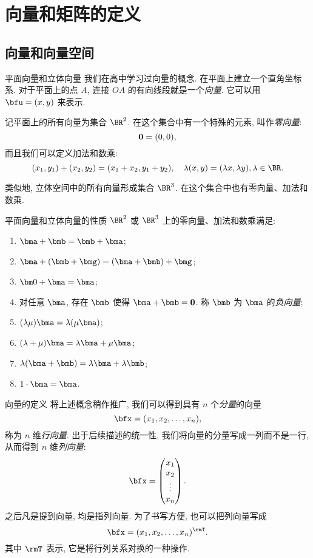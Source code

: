 \section{向量和矩阵的定义}


\subsection{向量和向量空间}
\begin{frame}{平面向量和立体向量}
	\onslide<+->
	我们在高中学习过向量的概念.
	\onslide<+->
	在平面上建立一个直角坐标系. 对于平面上的点 $A$, 连接 $OA$ 的有向线段就是一个\emph{向量}.
	\onslide<+->
	它可以用 $\bfu=(x,y)$ 来表示.

	\onslide<+->
	记平面上的所有向量为集合 $\BR^2$.
	\onslide<+->
	在这个集合中有一个特殊的元素, 叫作\emph{零向量}:
	\[{\bf0}=(0,0),\]
	\onslide<+->
	而且我们可以定义加法和数乘:
	\[(x_1,y_1)+(x_2,y_2)=(x_1+x_2,y_1+y_2),\quad
	\lambda(x,y)=(\lambda x,\lambda y),\lambda\in\BR.\]

	\onslide<+->
	类似地, 立体空间中的所有向量形成集合 $\BR^3$.
	\onslide<+->
	在这个集合中也有零向量、加法和数乘.
\end{frame}


\begin{frame}{平面向量和立体向量的性质}
	\onslide<+->
	$\BR^2$ 或 $\BR^3$ 上的零向量、加法和数乘满足:
	\begin{enumerate}
		\item $\bma+\bmb=\bmb+\bma$;
		\item $\bma+(\bmb+\bmg)=(\bma+\bmb)+\bmg$;
		\item ${\bm0}+\bma=\bma$;
		\item 对任意 $\bma$, 存在 $\bmb$ 使得 $\bma+\bmb={\bf0}$. 称 $\bmb$ 为 $\bma$ 的\emph{负向量};
		\item $(\lambda\mu)\bma=\lambda(\mu\bma)$;
		\item $(\lambda+\mu)\bma=\lambda\bma+\mu\bma$;
		\item $\lambda(\bma+\bmb)=\lambda\bma+\lambda\bmb$;
		\item $1\cdot\bma=\bma$.
	\end{enumerate}
\end{frame}


\begin{frame}{向量的定义}
	\onslide<+->
	将上述概念稍作推广, 我们可以得到具有 $n$ 个\emph{分量}的向量
	\[\bfx=(x_1,x_2,\dots,x_n),\]
	称为 $n$ 维\emph{行向量}.
	\onslide<+->
	出于后续描述的统一性, 我们将向量的分量写成一列而不是一行, 从而得到 $n$ 维\emph{列向量}:
	\[\bfx=\begin{pmatrix}
		x_1\\
		x_2\\
		\vdots\\
		x_n
	\end{pmatrix}.\]
	\onslide<+->
	\alert{之后凡是提到向量, 均是指列向量}.
	\onslide<+->
	为了书写方便, 也可以把列向量写成
	\[\bfx=(x_1,x_2,\dots,x_n)^\rmT.\]
	其中 $\rmT$ 表示, 它是将行列关系对换的一种操作.
\end{frame}


